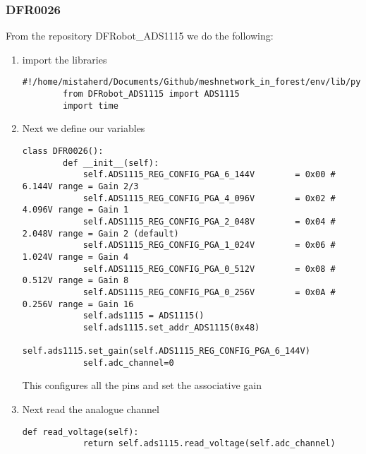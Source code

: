 \subsubsection{DFR0026}
\label{ADC section}
From the repository DFRobot_ADS1115 we do the following:
\begin{enumerate}
    \item import the libraries
    \begin{lstlisting}[style=mystyle]
        #!/home/mistaherd/Documents/Github/meshnetwork_in_forest/env/lib/python3.11
        from DFRobot_ADS1115 import ADS1115
        import time
    \end{lstlisting}
    \item Next we define our variables
    \begin{lstlisting}[style=mystyle]
    class DFR0026():
        def __init__(self):
            self.ADS1115_REG_CONFIG_PGA_6_144V        = 0x00 # 6.144V range = Gain 2/3
            self.ADS1115_REG_CONFIG_PGA_4_096V        = 0x02 # 4.096V range = Gain 1
            self.ADS1115_REG_CONFIG_PGA_2_048V        = 0x04 # 2.048V range = Gain 2 (default)
            self.ADS1115_REG_CONFIG_PGA_1_024V        = 0x06 # 1.024V range = Gain 4
            self.ADS1115_REG_CONFIG_PGA_0_512V        = 0x08 # 0.512V range = Gain 8
            self.ADS1115_REG_CONFIG_PGA_0_256V        = 0x0A # 0.256V range = Gain 16
            self.ads1115 = ADS1115()
            self.ads1115.set_addr_ADS1115(0x48)
            self.ads1115.set_gain(self.ADS1115_REG_CONFIG_PGA_6_144V)
            self.adc_channel=0
    \end{lstlisting}
    This configures all the pins  and set the associative gain
    \item Next read the analogue channel
    \begin{lstlisting}[style=mystyle]
        def read_voltage(self):
            return self.ads1115.read_voltage(self.adc_channel)
    \end{lstlisting}
\end{enumerate}
\newpage
